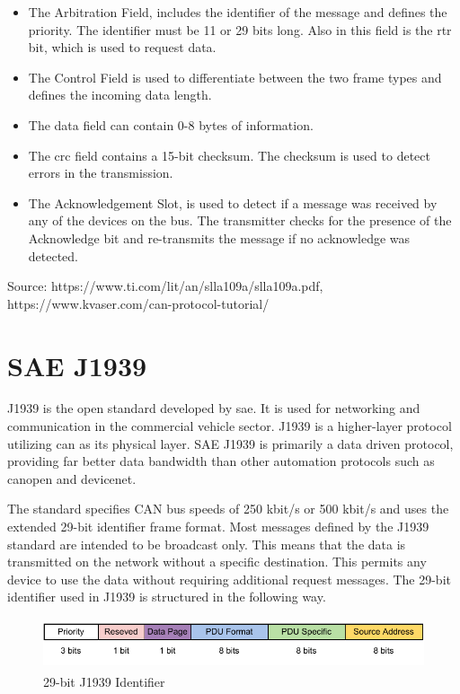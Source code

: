 \begin{itemize}
		\item The Arbitration Field, includes the identifier of the message and defines the priority. The identifier must be 11 or 29 bits long. Also in this field is the \acrfull{rtr} bit, which is used to request data.
		\item The Control Field is used to differentiate between the two frame types and defines the incoming data length.
		\item The data field can contain 0-8 bytes of information.
		\item The \acrshort{crc} field contains a 15-bit checksum. The checksum is used to detect errors in the transmission.
		\item The Acknowledgement Slot, is used to detect if a message was received by any of the devices on the bus. The transmitter checks for the presence of the Acknowledge bit and re-transmits the message if no acknowledge was detected.
\end{itemize}

Source: https://www.ti.com/lit/an/slla109a/slla109a.pdf,
https://www.kvaser.com/can-protocol-tutorial/
\newpage

\section{SAE J1939}
J1939 is the open standard developed by \acrfull{sae}. It is used for networking and communication in the commercial vehicle sector. J1939 is a higher-layer protocol utilizing \acrshort{can} as its physical layer. SAE J1939 is primarily a data driven protocol, providing far better data bandwidth than other automation protocols such as \gls{canopen} and \gls{devicenet}. 

The standard specifies CAN bus speeds of 250 kbit/s or 500 kbit/s and uses the extended 29-bit identifier frame format. Most messages defined by the J1939 standard are intended to be broadcast only. This means that the data is transmitted on the network without a specific destination. This permits any device to use the data without requiring additional request messages. The 29-bit identifier used in J1939 is structured in the following way.

\begin{figure}[h!]
	\centering
	\includegraphics[height=1.5cm]{images/j1939-identifier}
	\caption{29-bit J1939 Identifier}
	\vspace{-1.4ex}
	\label{fig:29-bit_J1939_Identifier}
\end{figure}

